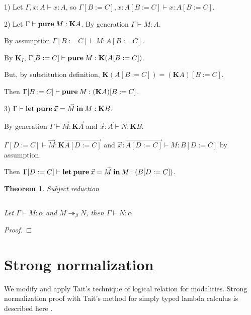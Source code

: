 \documentclass[a4paper]{article}
\newtheorem{theorem}{Theorem}
\begin{document}
  1) Let $\Gamma, x : A \vdash x : A$, so $\Gamma [B := C], x : A [B := C] \vdash x : A [B := C]$.

  \vspace{\baselineskip}

  2) Let $\Gamma \vdash {\bf pure \: } M : \textbf{K}A$. By generation $\Gamma \vdash M : A$.

  By assumption $\Gamma [B := C] \vdash M : A [B := C]$.

  By $\textbf{K}_I$, $\Gamma [B := C] \vdash {\bf pure \:} M : \textbf{K} (A [B := C])$.

  But, by substitution definition, $\textbf{K} (A [B := C]) = (\textbf{K}A) [B := C]$.

  Then $\Gamma [B := C] \vdash {\bf pure \:} M : (\textbf{K}A) [B := C]$.

  3) $\Gamma \vdash {\bf let \: pure} \: \vec{x} = \vec{M} \: {\bf in} \: M : {\bf K} B$.

  By generation $\Gamma \vdash \vec{M} : \textbf{K}\vec{A}$ and $\vec{x} : \vec{A} \vdash N : \textbf{K}B$.

  $\Gamma [D := C] \vdash \vec{M} : \textbf{K}\overrightarrow{A [D := C]}$ and $\vec{x} : \overrightarrow{A [D := C]} \vdash M : B [D := C]$ by assumption.

  Then $\Gamma [D := C] \vdash {\bf let \: pure } \: \vec{x} = \vec{M} \: {\bf in} \: M : {\bf } (B [D := C])$.



  \begin{theorem} Subject reduction

  $ $

  Let $\Gamma \vdash M : \alpha$ and $M \twoheadrightarrow_{\beta} N$, then $\Gamma \vdash N : \alpha$

  \end{theorem}

  \begin{proof}

  \end{proof}


  \vspace{\baselineskip}


\section{Strong normalization}

  We modify and apply Tait's technique of logical relation for modalities. Strong normalization proof with Tait's method for simply typed lambda calculus is described here \cite{Pierce}.
\end{document}
